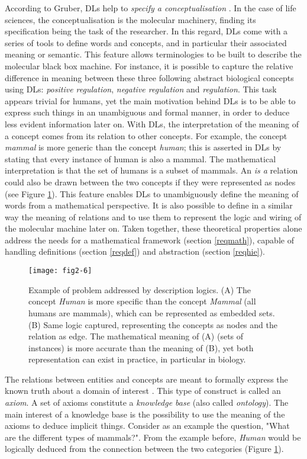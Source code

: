 According to Gruber, DLs help to \emph{specify a conceptualisation} \citep{gruber2009encyclopedia}. In the case of life sciences, the conceptualisation is the molecular machinery, finding its specification being the task of the researcher. In this regard, DLs come with a series of tools to define words and concepts, and in particular their associated meaning or semantic. This feature allows terminologies to be built to describe the molecular black box machine. For instance, it is possible to capture the relative difference in meaning between these three following abstract biological concepts using DLs: \emph{positive regulation}, \emph{negative regulation} and \emph{regulation}. This task appears trivial for humans, yet the main motivation behind DLs is to be able to express such things in an unambiguous and formal manner, in order to deduce less evident information later on. With DLs, the interpretation of the meaning of a concept comes from its relation to other concepts. For example, the concept \emph{mammal} is more generic than the concept \emph{human}; this is asserted in DLs by stating that every instance of human is also a mammal. The mathematical interpretation is that the set of humans is a subset of mammals. An \emph{is a} relation could also be drawn between the two concepts if they were represented as nodes (see Figure \ref{fig2-6}). This feature enables DLs to unambiguously define the meaning of words from a mathematical perspective. It is also possible to define in a similar way the meaning of relations and to use them to represent the logic and wiring of the molecular machine later on. Taken together, these theoretical properties alone address the needs for a mathematical framework (section \ref{reqmath}), capable of handling definitions (section \ref{reqdef}) and abstraction (section \ref{reqhie}).

\begin{figure}[ht]
    \centering
    \texttt{[image: fig2-6]}
    \caption{Example of problem addressed by description logics. (A) The concept \emph{Human} is more specific than the concept \emph{Mammal} (all humans are mammals), which can be represented as embedded sets. (B) Same logic captured, representing the concepts as nodes and the relation as edge. The mathematical meaning of (A) (sets of instances) is more accurate than the meaning of (B), yet both representation can exist in practice, in particular in biology.}
    \label{fig2-6}
\end{figure}

The relations between entities and concepts are meant to formally express the known truth about a domain of interest \citep{stevens2007using} \citep{krotzsch2012owl} \citep{hitzler2009owl}. This type of construct is called an \emph{axiom}. A set of axioms constitute a \emph{knowledge base} (also called \emph{ontology}). The main interest of a knowledge base is the possibility to use the meaning of the axioms to deduce implicit things. Consider as an example the question, "What are the different types of mammals?". From the example before, \emph{Human} would be logically deduced from the connection between the two categories (Figure \ref{fig2-6}).

